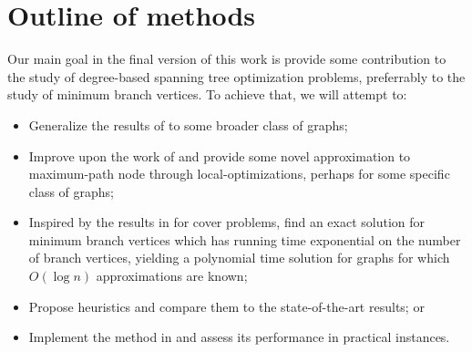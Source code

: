 \documentclass[12pt]{article}
\begin{document}
\section{Outline of methods} \label{sec:methods}

Our main goal in the final version of this work is provide some contribution to the study of degree-based spanning tree optimization problems, preferrably to the study of minimum branch vertices.
To achieve that, we will attempt to:

\begin{itemize}
  \item Generalize the results of \cite{salamon2010} to some broader class of graphs;
  \item Improve upon the work of \cite{chimani2015} and provide some novel approximation to maximum-path node through local-optimizations, perhaps for some specific class of graphs;
  \item Inspired by the results in \cite{karpinski1996} for cover problems, find an exact solution for minimum branch vertices which has running time exponential on the number of branch vertices, yielding a polynomial time solution for graphs for which $O(\log n)$ approximations are known;
  \item Propose heuristics and compare them to the state-of-the-art results; or
  \item Implement the method in \cite{salamon2010} and assess its performance in practical instances.
\end{itemize}



\end{document}
